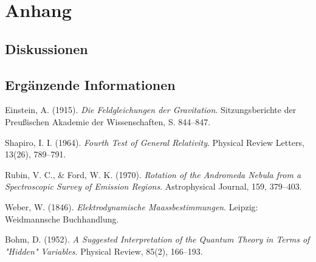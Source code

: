 \documentclass{book}
\numberwithin{equation}{section}
\begin{document}
\part{Anhang}
\chapter{Diskussionen}



\chapter{Ergänzende Informationen}


\begin{thebibliography}{9}

Einstein, A. (1915). 
\textit{Die Feldgleichungen der Gravitation}. 
Sitzungsberichte der Preußischen Akademie der Wissenschaften, 
S. 844–847.

Shapiro, I. I. (1964). 
\textit{Fourth Test of General Relativity}. 
Physical Review Letters, 13(26), 789–791.

Rubin, V. C., \& Ford, W. K. (1970). 
\textit{Rotation of the Andromeda Nebula from a Spectroscopic Survey of Emission Regions}. 
Astrophysical Journal, 159, 379–403.

Weber, W. (1846). 
\textit{Elektrodynamische Maassbestimmungen}. 
Leipzig: Weidmannsche Buchhandlung.

Bohm, D. (1952). 
\textit{A Suggested Interpretation of the Quantum Theory in Terms of "Hidden" Variables}. 
Physical Review, 85(2), 166–193.

\end{thebibliography}
\end{document}
